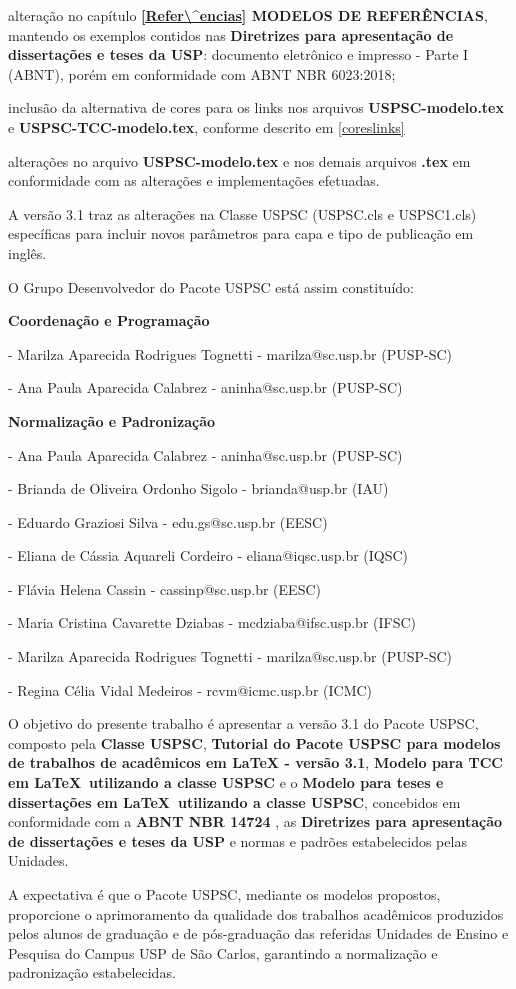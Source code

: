 \begin{alineas}
	\item alteração no capítulo \textbf{\ref{Refer\^encias} MODELOS DE REFERÊNCIAS}, mantendo os exemplos contidos nas \textbf{Diretrizes para apresentação de dissertações e teses da USP}: documento eletrônico e impresso - Parte I (ABNT), por\'em em conformidade com ABNT NBR 6023:2018; 
	\item inclusão da alternativa de cores para os links nos arquivos \textbf{USPSC-modelo.tex} e \textbf{USPSC-TCC-modelo.tex}, conforme descrito em \ref{coreslinks} 
	\item alterações no arquivo \textbf{USPSC-modelo.tex} e nos demais arquivos \textbf{.tex} em conformidade com as alterações e implementações efetuadas.	\\
\end{alineas}

	A versão 3.1 traz as alterações na Classe USPSC (USPSC.cls e USPSC1.cls) específicas para incluir novos par\^ametros para capa e tipo de publicação em ingl\^es.

	O Grupo Desenvolvedor do Pacote USPSC est\'a assim constituído:

\textbf{Coordenação e Programação}

- Marilza Aparecida Rodrigues Tognetti - marilza@sc.usp.br (PUSP-SC)	

- Ana Paula Aparecida Calabrez - aninha@sc.usp.br (PUSP-SC) 

\textbf{Normalização e Padronização}

- Ana Paula Aparecida Calabrez - aninha@sc.usp.br (PUSP-SC)

- Brianda de Oliveira Ordonho Sigolo - brianda@usp.br (IAU)

- Eduardo Graziosi Silva - edu.gs@sc.usp.br (EESC)

- Eliana de C\'assia Aquareli Cordeiro - eliana@iqsc.usp.br (IQSC)

- Fl\'avia Helena Cassin - cassinp@sc.usp.br (EESC)	

- Maria Cristina Cavarette Dziabas - mcdziaba@ifsc.usp.br (IFSC)	

- Marilza Aparecida Rodrigues Tognetti - marilza@sc.usp.br (PUSP-SC)

- Regina C\'elia Vidal Medeiros - rcvm@icmc.usp.br (ICMC)

	O objetivo do presente trabalho \'e apresentar a versão 3.1 do Pacote USPSC, composto pela \textbf{Classe USPSC}, \textbf{Tutorial do Pacote USPSC para modelos de trabalhos de acad\^emicos em LaTeX - vers\~ao 3.1},  \textbf{Modelo para TCC em \LaTeX\ utilizando a classe USPSC} e o \textbf{Modelo para teses e dissertações em \LaTeX\ utilizando a classe USPSC}, concebidos em conformidade com a \textbf{ABNT NBR 14724} \cite{nbr14724}, as \textbf{Diretrizes para apresentação de dissertações e teses da USP} \cite{aguia2020} e normas e padrões estabelecidos pelas Unidades. 
	
	A expectativa \'e que o Pacote USPSC, mediante os modelos propostos, proporcione o aprimoramento da qualidade dos trabalhos acad\^emicos produzidos pelos alunos de graduação e de pós-graduação das referidas Unidades de Ensino e Pesquisa do Campus USP de São Carlos, garantindo a normalização e padronização estabelecidas.
	
	